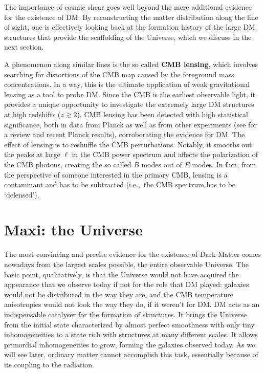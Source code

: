 The importance of cosmic shear goes well beyond the mere additional evidence for the existence of DM. By reconstructing the matter distribution along the line of sight, one is effectively looking back at the formation history of the large DM structures that provide the scaffolding of the Universe, which we discuss in the next section.

\smallskip
A phenomenon along similar lines is the so called {\bf CMB lensing}, which involves searching 
 for distortions of the CMB map caused by the foreground mass concentrations. 
In a way, this is the ultimate application of weak gravitational lensing as a tool to  probe DM. Since the CMB is the earliest observable light, it provides a unique opportunity to investigate the extremely large DM structures at high redshifts ($z \gtrsim 2$). CMB lensing has been detected with high statistical significance, both in data from {\sc Planck} as well as from other experiments (see \cite{CMBlensing} for a review and recent {\sc Planck} results), corroborating the evidence for DM.
The effect of lensing is to reshuffle the CMB perturbations. Notably, it smooths out the peaks at large $\ell$ in the CMB power spectrum and affects the polarization of the CMB photons, creating the so called $B$ modes out of $E$ modes. In fact, from the perspective of someone interested in the primary CMB, lensing is a contaminant and has to be subtracted (i.e.,~the CMB spectrum has to be `delensed'). 


\section{Maxi: the Universe}
\label{sec:evidencesmaxi}
The most convincing and precise evidence for the existence of Dark Matter comes nowadays from the largest scales possible, the entire observable Universe.
The basic point, qualitatively, is that the Universe would not have acquired the appearance that we observe today if not for the role that DM played: galaxies would not be distributed in the way they are, and the CMB temperature anisotropies would not look the way they do, if it weren't for DM. DM acts as an indispensable catalyser for the formation of structures. It brings the Universe from the initial state characterized by almost perfect smoothness with only tiny inhomogeneities to a state rich with structures at many different scales. It allows primordial inhomogeneities to grow, forming the galaxies observed today. As we will see later, ordinary matter cannot accomplish this task, essentially because of its coupling to the radiation.

